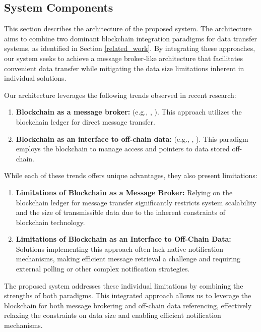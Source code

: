\documentclass[10pt]{llncs}
\begin{document}
\subsection{System Components}

This section describes the architecture of the proposed system. 
The architecture aims to combine two dominant blockchain integration paradigms for data transfer systems, as identified in Section \ref{related_work}. 
By integrating these approaches, our system seeks to achieve a message broker-like architecture that facilitates convenient data transfer while mitigating the data size limitations inherent in individual solutions.

Our architecture leverages the following trends observed in recent research:

\begin{enumerate}
    \item \textbf{Blockchain as a message broker:} (e.g., \cite{Ghaemi2021}, \cite{kim2020hybrid}). This approach utilizes the blockchain ledger for direct message transfer.
    \item \textbf{Blockchain as an interface to off-chain data:} (e.g., \cite{Jia2023}, \cite{Wang2024}). This paradigm employs the blockchain to manage access and pointers to data stored off-chain.
\end{enumerate}

While each of these trends offers unique advantages, they also present limitations:

\begin{enumerate}
    \item \textbf{Limitations of Blockchain as a Message Broker:} Relying on the blockchain ledger for message transfer significantly restricts system scalability and the size of transmissible data due to the inherent constraints of blockchain technology.

    \item \textbf{Limitations of Blockchain as an Interface to Off-Chain Data:} Solutions implementing this approach often lack native notification mechanisms, making efficient message retrieval a challenge and requiring external polling or other complex notification strategies.
\end{enumerate}

The proposed system addresses these individual limitations by combining the strengths of both paradigms. 
This integrated approach allows us to leverage the blockchain for both message brokering and off-chain data referencing, effectively relaxing the constraints on data size and enabling efficient notification mechanisms. 
\end{document}
